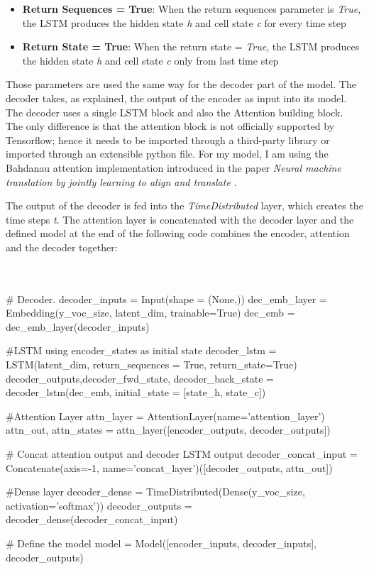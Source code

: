\begin{itemize}
	\item \textbf{Return Sequences = True}: When the return sequences parameter is \textit{True}, the LSTM produces the hidden state \textit{h} and cell state \textit{c} for every time step
	\item \textbf{Return State = True}: When the return state = \textit{True}, the LSTM produces the hidden state \textit{h} and cell state \textit{c} only from last time step 
\end{itemize}


Those parameters are used the same way for the decoder part of the model. The decoder takes, as explained, the output of the encoder as input into its model. The decoder uses a single LSTM block and also the Attention building block. The only difference is that the attention block is not officially supported by Tensorflow; hence it needs to be imported through a third-party library or imported through an extensible python file. For my model, I am using the Bahdanau attention implementation introduced in the paper \textit{Neural machine translation by jointly learning to align and translate} \cite{bah}.

The output of the decoder is fed into the \textit{TimeDistributed} layer, which creates the time steps \textit{t}. The attention layer is concatenated with the decoder layer and the defined model at the end of the following code combines the encoder, attention and the decoder together: \\ \\ \\

\begin{python}
# Decoder. 
decoder_inputs = Input(shape = (None,)) 
dec_emb_layer = Embedding(y_voc_size, latent_dim, trainable=True) 
dec_emb = dec_emb_layer(decoder_inputs) 

#LSTM using encoder_states as initial state
decoder_lstm = LSTM(latent_dim, return_sequences = True, return_state=True) 
decoder_outputs,decoder_fwd_state, decoder_back_state = decoder_lstm(dec_emb, initial_state = [state_h, state_c]) 

#Attention Layer
attn_layer = AttentionLayer(name='attention_layer') 
attn_out, attn_states = attn_layer([encoder_outputs, decoder_outputs]) 

# Concat attention output and decoder LSTM output 
decoder_concat_input = Concatenate(axis=-1, name='concat_layer')([decoder_outputs, attn_out])

#Dense layer
decoder_dense = TimeDistributed(Dense(y_voc_size, activation='softmax')) 
decoder_outputs = decoder_dense(decoder_concat_input) 

# Define the model
model = Model([encoder_inputs, decoder_inputs], decoder_outputs) 
\end{python}


